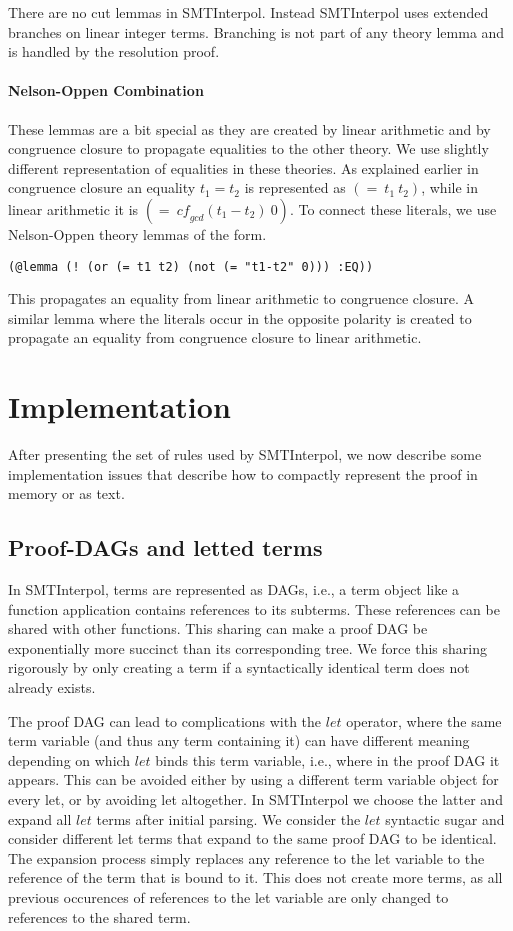 \documentclass[a4paper]{article}
\newcommand\si{SMTInterpol\xspace}
\newcommand\cf{\mathit{cf}}
\begin{document}
There are no cut lemmas in \si.  Instead \si uses extended branches on
linear integer terms.  Branching is not part of any theory lemma and
is handled by the resolution proof.

\paragraph{Nelson-Oppen Combination}

These lemmas are a bit special as they are created by linear
arithmetic and by congruence closure to propagate equalities to the
other theory.  We use slightly different representation of equalities
in these theories.  As explained earlier in congruence closure an
equality $t_1=t_2$ is represented as $(=\ t_1\ t_2)$,
while in linear arithmetic it is $(=\ \cf_{gcd}(t_1-t_2)\ 0)$.
To connect these literals, we use Nelson-Oppen theory lemmas of the form.
\begin{verbatim}
(@lemma (! (or (= t1 t2) (not (= "t1-t2" 0))) :EQ))
\end{verbatim}
This propagates an equality from linear arithmetic to congruence
closure.  A similar lemma where the literals occur in the opposite
polarity is created to propagate an equality from congruence closure
to linear arithmetic.

\section{Implementation}
After presenting the set of rules used by \si, we now describe some
implementation issues that describe how to compactly represent the
proof in memory or as text.

\subsection{Proof-DAGs and letted terms}
In \si, terms are represented as DAGs, i.e., a term object like a
function application contains references to its subterms.  These
references can be shared with other functions.  This sharing can make
a proof DAG be exponentially more succinct than its corresponding
tree.  We force this sharing rigorously by only creating a term if a
syntactically identical term does not already exists.

The proof DAG can lead to complications with the $let$ operator, where
the same term variable (and thus any term containing it) can have
different meaning depending on which $let$ binds this term variable,
i.e., where in the proof DAG it appears.  This can be avoided either
by using a different term variable object for every let, or by
avoiding let altogether.  In \si we choose the latter and expand all
$let$ terms after initial parsing.  We consider the $let$ syntactic
sugar and consider different let terms that expand to the same proof
DAG to be identical.  The expansion process simply replaces any
reference to the let variable to the reference of the term that is
bound to it.  This does not create more terms, as all previous
occurences of references to the let variable are only changed to
references to the shared term.
\end{document}
